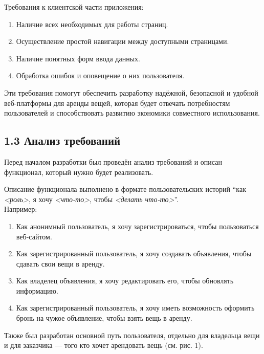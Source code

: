 \documentclass[14pt]{extarticle}
\begin{document}
\newpage

Требования к клиентской части приложения:
\begin{enumerate}
    \item Наличие всех необходимых для работы страниц.
    \item Осуществление простой навигации между доступными страницами.
    \item Наличие понятных форм ввода данных.
    \item Обработка ошибок и оповещение о них пользователя.
\end{enumerate}

\bigskip

Эти требования помогут обеспечить разработку надёжной,
безопасной и удобной веб-платформы для аренды вещей,
которая будет отвечать потребностям пользователей и
способствовать развитию экономики совместного использования.

\newpage

\subsection{1.3 Анализ требований}

\bigskip

Перед началом разработки был проведён анализ требований и
описан функционал, который нужно будет реализовать.

Описание функционала выполнено в формате пользовательских историй
``как \textit{<роль>}, я хочу \textit{<что-то>}, чтобы \textit{<делать что-то>}''.\\

Например:
\begin{enumerate}
    \item Как анонимный пользователь, я хочу зарегистрироваться, чтобы пользоваться веб-сайтом.
    \item Как зарегистрированный пользователь, я хочу создавать объявления, чтобы сдавать свои вещи в аренду.
    \item Как владелец объявления, я хочу редактировать его, чтобы обновлять информацию.
    \item Как зарегистрированный пользователь, я хочу иметь возможность оформить бронь на чужое объявление, чтобы взять вещь в аренду.
\end{enumerate}


Также был разработан основной путь пользователя,
отдельно для владельца вещи и для заказчика
--- того кто хочет арендовать вещь (см. рис. 1).
\end{document}
